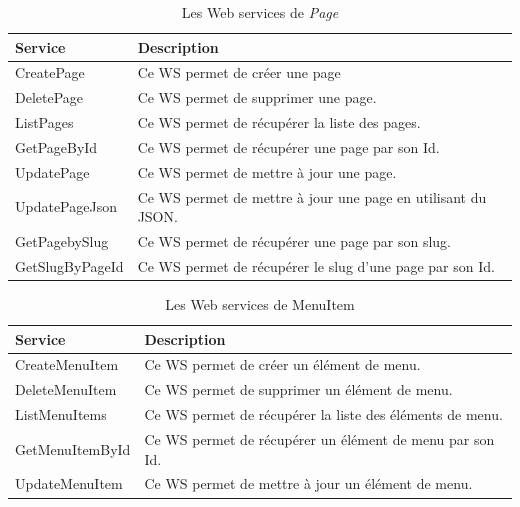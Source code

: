 \begin{table}[H]
    \centering
    \begin{tabular}{|m{5cm}|m{10cm}|}
      \hline
          \textbf{Service} & \textbf{Description} \\
    \hline
      CreatePage   & Ce WS permet de créer une page\\
      \hline
      DeletePage & Ce WS permet de supprimer une page.\\
      \hline
      ListPages & Ce WS permet de récupérer la liste des pages.\\
      \hline
GetPageById & Ce WS permet de récupérer une page par son Id.\\
\hline
UpdatePage & Ce WS permet de mettre à jour une page.\\
\hline
UpdatePageJson & Ce WS permet de mettre à jour une page en utilisant du JSON.\\
\hline
GetPagebySlug & Ce WS permet de récupérer une page par son slug.\\
\hline
GetSlugByPageId & Ce WS permet de récupérer le slug d'une page par son Id.\\
\hline
      
    \end{tabular}
    \caption{Les Web services de \textit{Page}}
    \label{tab:my_label}
\end{table}





\begin{table}[H]
    \centering
    \begin{tabular}{|m{5cm}|m{10cm}|}
    \hline
    \textbf{Service} & \textbf{Description} \\
    \hline
     CreateMenuItem & Ce WS permet de créer un élément de menu.\\
    \hline
    DeleteMenuItem & Ce WS permet de supprimer un élément de menu.\\
    \hline
    ListMenuItems & Ce WS permet de récupérer la liste des éléments de menu.\\
    \hline
    GetMenuItemById & Ce WS permet de récupérer un élément de menu par son Id.\\
    \hline
    UpdateMenuItem & Ce WS permet de mettre à jour un élément de menu.\\
    \hline
    \end{tabular}
    \caption{Les Web services de MenuItem}
    \label{tab:my_label}
\end{table}







